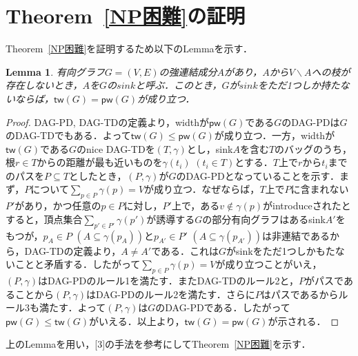 \documentclass[master]{kuisthesis}		%
\theoremstyle{plain}
\newtheorem{lemma}{Lemma}
\theoremstyle{definition}
\begin{document}
\section{Theorem~\ref{NP困難}の証明}
Theorem~\ref{NP困難}を証明するため以下のLemmaを示す．

\begin{lemma}\label{sink}
    有向グラフ$G=(V, E)$の強連結成分$A$があり，$A$から$V \backslash A$への枝が存在しないとき，$A$を$G$の$sink$と呼ぶ．このとき，$G$が$sink$をただ1つしか持たないならば，$\mathsf{tw}(G) = \mathsf{pw}(G)$が成り立つ．
\end{lemma}


\begin{proof}
    DAG-PD, DAG-TDの定義より，widthが$\mathsf{pw}(G)$である$G$のDAG-PDは$G$のDAG-TDでもある．よって$\mathsf{tw}(G) \leq \mathsf{pw}(G)$が成り立つ．一方，widthが$\mathsf{tw}(G)$である$G$のnice DAG-TDを$(T, \gamma)$とし，sink$A$を含む$T$のバッグのうち，根$r \in T$からの距離が最も近いものを$\gamma(t_i)$ $(t_i \in T)$とする．$T$上で$r$から$t_i$までのパスを$P \subseteq T$としたとき，$(P, \gamma)$が$G$のDAG-PDとなっていることを示す．まず，$P$について$\sum_{p \in P} \gamma(p) = V$が成り立つ．なぜならば，$T$上で$P$に含まれない$P'$があり，かつ任意の$p \in P$に対し，$P'$上で，ある$v \notin \gamma(p)$がintroduceされたとすると，頂点集合$\sum_{p' \in P'} \gamma(p')$が誘導する$G$の部分有向グラフはあるsink$A'$をもつが，$p_A \in P$ $(A \subseteq \gamma(p_A))$と$p_{A'} \in P'$ $(A \subseteq \gamma(p_{A'}))$は非連結であるから，DAG-TDの定義より，$A \neq A'$である．これは$G$がsinkをただ1つしかもたないことと矛盾する．したがって$\sum_{p \in P} \gamma(p) = V$が成り立つことがいえ，$(P, \gamma)$はDAG-PDのルール1を満たす．またDAG-TDのルール2と，$P$がパスであることから$(P, \gamma)$はDAG-PDのルール2を満たす．さらに$P$はパスであるからルール3も満たす．よって$(P, \gamma)$は$G$のDAG-PDである．したがって$\mathsf{pw}(G) \leq \mathsf{tw}(G)$がいえる．以上より，$\mathsf{tw}(G) = \mathsf{pw}(G)$が示される．
\end{proof}


上のLemmaを用い，[3]の手法を参考にしてTheorem~\ref{NP困難}を示す．
\end{document}
